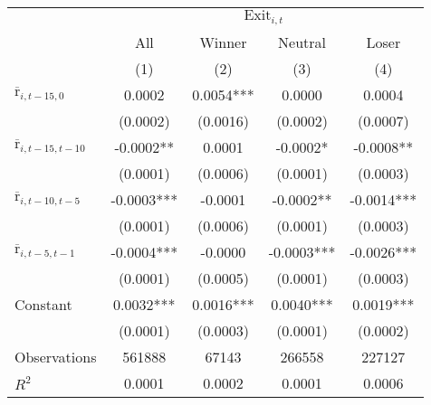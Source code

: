 \begin{tabular}{lcccc}
\toprule
 & \multicolumn{4}{c}{$\text{Exit}_{i,t}$} \\
\cmidrule{2-5}
 & All & Winner & Neutral & Loser\\
 & (1) & (2) & (3) & (4) \\
\midrule
$\overline{\text{r}}_{i,t-15,0}$ & 0.0002 & 0.0054*** & 0.0000 & 0.0004 \\
 & (0.0002) & (0.0016) & (0.0002) & (0.0007) \\
$\overline{\text{r}}_{i,t-15,t-10}$ & -0.0002** & 0.0001 & -0.0002* & -0.0008** \\
 & (0.0001) & (0.0006) & (0.0001) & (0.0003) \\
$\overline{\text{r}}_{i,t-10,t-5}$ & -0.0003*** & -0.0001 & -0.0002** & -0.0014*** \\
 & (0.0001) & (0.0006) & (0.0001) & (0.0003) \\
$\overline{\text{r}}_{i,t-5,t-1}$ & -0.0004*** & -0.0000 & -0.0003*** & -0.0026*** \\
 & (0.0001) & (0.0005) & (0.0001) & (0.0003) \\
Constant & 0.0032*** & 0.0016*** & 0.0040*** & 0.0019*** \\
 & (0.0001) & (0.0003) & (0.0001) & (0.0002) \\
\midrule
Observations & 561888 & 67143 & 266558 & 227127 \\
$R^2$ & 0.0001 & 0.0002 & 0.0001 & 0.0006 \\
\bottomrule
\end{tabular}